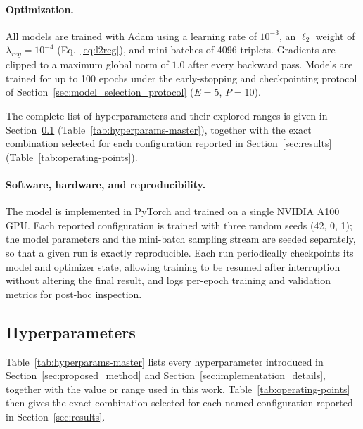 \paragraph{Optimization.}
All models are trained with Adam using a learning rate of $10^{-3}$, an $\ell_2$ weight of
$\lambda_{reg}=10^{-4}$ (Eq.~\eqref{eq:l2reg}), and mini-batches of 4096 triplets. Gradients
are clipped to a maximum global norm of $1.0$ after every backward pass. Models are trained
for up to 100 epochs under the early-stopping and checkpointing protocol of
Section~\ref{sec:model_selection_protocol} ($E=5$, $P=10$).

The complete list of hyperparameters and their explored ranges is given in
Section~\ref{sec:hyperparameters} (Table~\ref{tab:hyperparams-master}), together with the
exact combination selected for each configuration reported in Section~\ref{sec:results}
(Table~\ref{tab:operating-points}).

\paragraph{Software, hardware, and reproducibility.}
The model is implemented in PyTorch and trained on a single NVIDIA A100 GPU. Each reported
configuration is trained with three random seeds (42, 0, 1); the model parameters and the
mini-batch sampling stream are seeded separately, so that a given run is exactly
reproducible. Each run periodically checkpoints its model and optimizer state, allowing
training to be resumed after interruption without altering the final result, and logs
per-epoch training and validation metrics for post-hoc inspection.

\subsection{Hyperparameters}
\label{sec:hyperparameters}

Table~\ref{tab:hyperparams-master} lists every hyperparameter introduced in
Section~\ref{sec:proposed_method} and Section~\ref{sec:implementation_details}, together with
the value or range used in this work. Table~\ref{tab:operating-points} then gives the exact
combination selected for each named configuration reported in Section~\ref{sec:results}.

